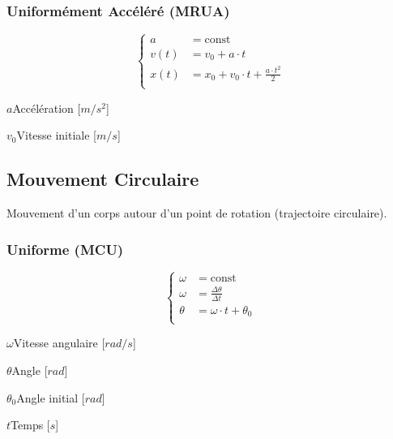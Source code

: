 \documentclass[12pt,a4paper]{article} %
\newcommand\const{\mathrm{const}}
\begin{document}
\subsubsection*{Uniformément Accéléré (MRUA)}
\begin{twocols}
	\[
	\left\{
		\begin{aligned}
			a &= \const \\
			v(t) &= v_0 + a \cdot t \\
			x(t) &= x_0 + v_0 \cdot t + \frac{a \cdot t^2}{2} \\
		\end{aligned}
	\right.
	\]
\nextcol
	\begin{vardef}
		\item{$a$}{Accélération [$m/s^2$]}
		\item{$v_0$}{Vitesse initiale [$m/s$]}
	\end{vardef}
\end{twocols}

\subsection{Mouvement Circulaire}
Mouvement d'un corps autour d'un point de rotation (trajectoire circulaire).
\subsubsection*{Uniforme (MCU)}
\begin{twocols}[0.5][0.5]
	\[
	\left\{
		\begin{aligned}
			\omega &= \const \\
			\omega &= \frac{\Delta\theta}{\Delta t} \\
			\theta &= \omega \cdot t + \theta_0 \\
		\end{aligned}
	\right.
	\]
\nextcol
	\begin{vardef}
		\item{$\omega$}{Vitesse angulaire [$rad/s$]}
		\item{$\theta$}{Angle [$rad$]}
		\item{$\theta_0$}{Angle initial [$rad$]}
		\item{$t$}{Temps [$s$]}
	\end{vardef}
\end{twocols}
\end{document}
